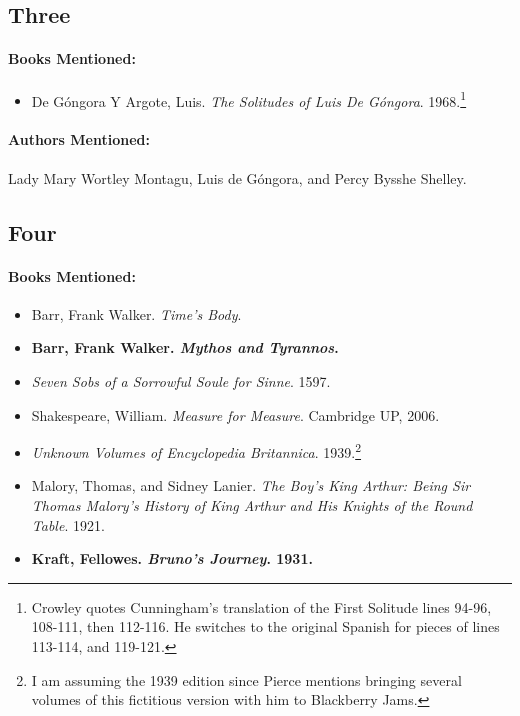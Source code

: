 \documentclass[12pt]{article}
\providecommand{\tightlist}{%
  \setlength{\itemsep}{0pt}\setlength{\parskip}{0pt}}
\begin{document}
\subsection{Three}\label{three}

\paragraph{Books Mentioned:}\label{books-mentioned-4}

\begin{itemize}
\tightlist
\item
  De Góngora Y Argote, Luis. \emph{The Solitudes of Luis De Góngora}. 1968.\footnote{Crowley quotes Cunningham's translation of the First Solitude lines 94-96, 108-111, then 112-116. He switches to the original Spanish for pieces of lines 113-114, and 119-121.}
\end{itemize}

\paragraph{Authors Mentioned:}\label{authors-mentioned-2}

Lady Mary Wortley Montagu, Luis de Góngora, and Percy Bysshe Shelley.

\subsection{Four}\label{four}

\paragraph{Books Mentioned:}\label{books-mentioned-5}

\begin{itemize}
\tightlist
\item
  Barr, Frank Walker. \emph{Time's Body}.
\item
  \textbf{Barr, Frank Walker. \emph{Mythos and Tyrannos}.}
\item
  \emph{Seven Sobs of a Sorrowful Soule for Sinne}. 1597.
\item
  Shakespeare, William. \emph{Measure for Measure}. Cambridge UP, 2006.
\item
  \emph{Unknown Volumes of Encyclopedia Britannica}. 1939.\footnote{I am assuming the 1939 edition since Pierce mentions bringing several volumes of this fictitious version with him to Blackberry Jams.}
\item
  Malory, Thomas, and Sidney Lanier. \emph{The Boy's King Arthur: Being Sir Thomas Malory's History of King Arthur and His Knights of the Round Table}. 1921.
\item
  \textbf{Kraft, Fellowes. \emph{Bruno's Journey}. 1931.}
\end{itemize}
\end{document}
